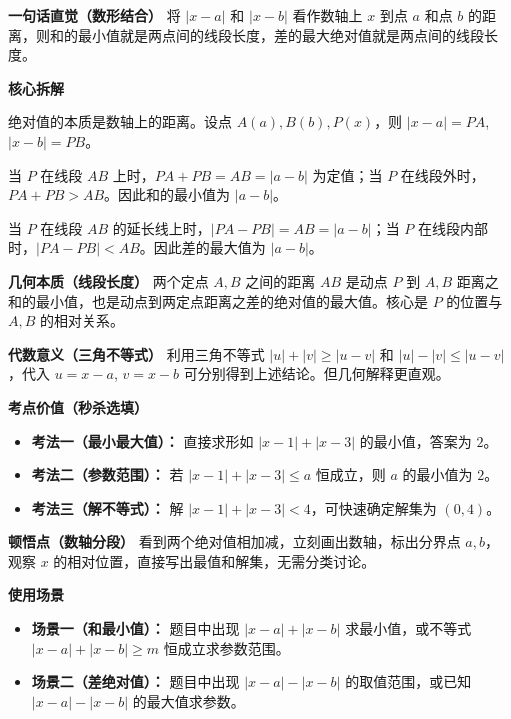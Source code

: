 \begin{explanationbox}
	\textbf{\textcolor{CExplanation}{一句话直觉（数形结合）}}
	将 $|x-a|$ 和 $|x-b|$ 看作数轴上 $x$ 到点 $a$ 和点 $b$ 的距离，则和的最小值就是两点间的线段长度，差的最大绝对值就是两点间的线段长度。

	\medskip
	\textbf{\textcolor{CExplanation}{核心拆解}}
	\begin{description}[style=nextline, leftmargin=2.8em, labelsep=0.5em, itemsep=0.45em]
		\item[\textbf{要点一（几何意义）：}]
			绝对值的本质是数轴上的距离。设点 $A(a), B(b), P(x)$，则 $|x-a| = PA$, $|x-b| = PB$。
		\item[\textbf{要点二（和最小值）：}]
			当 $P$ 在线段 $AB$ 上时，$PA+PB = AB = |a-b|$ 为定值；当 $P$ 在线段外时，$PA+PB > AB$。因此和的最小值为 $|a-b|$。
		\item[\textbf{要点三（差的最大值）：}]
			当 $P$ 在线段 $AB$ 的延长线上时，$|PA-PB| = AB = |a-b|$；当 $P$ 在线段内部时，$|PA-PB| < AB$。因此差的最大值为 $|a-b|$。
	\end{description}

	\medskip
	\textbf{\textcolor{CExplanation}{几何本质（线段长度）}}
	两个定点 $A, B$ 之间的距离 $AB$ 是动点 $P$ 到 $A, B$ 距离之和的最小值，也是动点到两定点距离之差的绝对值的最大值。核心是 $P$ 的位置与 $A, B$ 的相对关系。

	\medskip
	\textbf{\textcolor{CExplanation}{代数意义（三角不等式）}}
	利用三角不等式 $|u|+|v|\ge |u-v|$ 和 $|u|-|v|\le |u-v|$，代入 $u=x-a$, $v=x-b$ 可分别得到上述结论。但几何解释更直观。

	\medskip
	\textbf{\textcolor{CExplanation}{考点价值（秒杀选填）}}
	\begin{itemize}[leftmargin=*, itemsep=0.5em, topsep=0.4em]
		\item \textbf{考法一（最小最大值）：} 直接求形如 $|x-1|+|x-3|$ 的最小值，答案为 $2$。
		\item \textbf{考法二（参数范围）：} 若 $|x-1|+|x-3|\le a$ 恒成立，则 $a$ 的最小值为 $2$。
		\item \textbf{考法三（解不等式）：} 解 $|x-1|+|x-3|<4$，可快速确定解集为 $(0,4)$。
	\end{itemize}

	\medskip
	\textbf{\textcolor{CExplanation}{顿悟点（数轴分段）}}
	看到两个绝对值相加减，立刻画出数轴，标出分界点 $a, b$，观察 $x$ 的相对位置，直接写出最值和解集，无需分类讨论。

	\medskip
	\textbf{\textcolor{CExplanation}{使用场景}}
	\begin{itemize}[leftmargin=*, itemsep=0.5em, topsep=0.4em]
		\item \textbf{场景一（和最小值）：} 题目中出现 $|x-a|+|x-b|$ 求最小值，或不等式 $|x-a|+|x-b|\ge m$ 恒成立求参数范围。
		\item \textbf{场景二（差绝对值）：} 题目中出现 $|x-a|-|x-b|$ 的取值范围，或已知 $|x-a|-|x-b|$ 的最大值求参数。
	\end{itemize}

\end{explanationbox}
